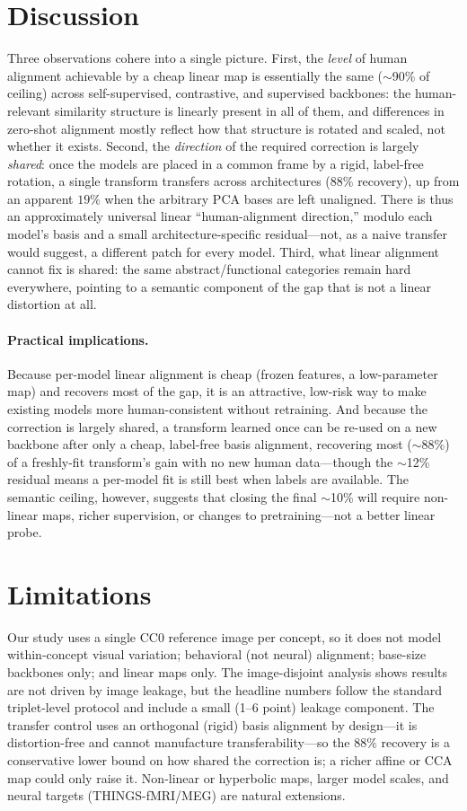 \documentclass{article}
\begin{document}
\section{Discussion}
Three observations cohere into a single picture. First, the \emph{level} of human
alignment achievable by a cheap linear map is essentially the same ($\sim$90\% of
ceiling) across self-supervised, contrastive, and supervised backbones: the
human-relevant similarity structure is linearly present in all of them, and
differences in zero-shot alignment mostly reflect how that structure is rotated
and scaled, not whether it exists. Second, the \emph{direction} of the required
correction is largely \emph{shared}: once the models are placed in a common frame by
a rigid, label-free rotation, a single transform transfers across architectures
($88\%$ recovery), up from an apparent $19\%$ when the arbitrary PCA bases are left
unaligned. There is thus an approximately universal linear ``human-alignment
direction,'' modulo each model's basis and a small architecture-specific
residual---not, as a naive transfer would suggest, a different patch for every model.
Third, what linear alignment cannot fix is shared: the
same abstract/functional categories remain hard everywhere, pointing to a
semantic component of the gap that is not a linear distortion at all.

\paragraph{Practical implications.} Because per-model linear alignment is cheap
(frozen features, a low-parameter map) and recovers most of the gap, it is an
attractive, low-risk way to make existing models more human-consistent without
retraining. And because the correction is largely shared, a transform learned once
can be re-used on a new backbone after only a cheap, label-free basis alignment,
recovering most ($\sim$88\%) of a freshly-fit transform's gain with no new human
data---though the $\sim$12\% residual means a per-model fit is still best when
labels are available. The semantic ceiling, however, suggests that closing the
final $\sim$10\% will require non-linear maps, richer supervision, or changes to
pretraining---not a better linear probe.

\section{Limitations}
Our study uses a single CC0 reference image per concept, so it does not model
within-concept visual variation; behavioral (not neural) alignment; base-size
backbones only; and linear maps only. The image-disjoint analysis shows results
are not driven by image leakage, but the headline numbers follow the standard
triplet-level protocol and include a small (1--6 point) leakage component. The
transfer control uses an orthogonal (rigid) basis alignment by design---it is
distortion-free and cannot manufacture transferability---so the $88\%$ recovery is a
conservative lower bound on how shared the correction is; a richer affine or CCA map
could only raise it. Non-linear or hyperbolic
maps, larger model scales, and neural targets (THINGS-fMRI/MEG) are natural
extensions.
\end{document}
